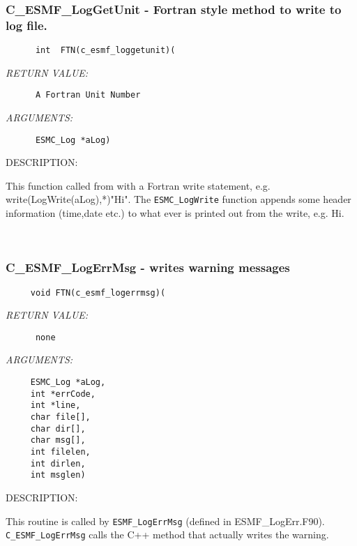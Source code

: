   \subsubsection [C\_ESMF\_LogGetUnit] {C\_ESMF\_LogGetUnit - Fortran style method to write to log file.}


  
\begin{verbatim}      int  FTN(c_esmf_loggetunit)(\end{verbatim}{\em RETURN VALUE:}
\begin{verbatim}      A Fortran Unit Number\end{verbatim}{\em ARGUMENTS:}
\begin{verbatim}      ESMC_Log *aLog)\end{verbatim}
{\sf DESCRIPTION:\\ }


      This function called from with a Fortran write statement, e.g.
      write(LogWrite(aLog),*)"Hi".  The {\tt ESMC\_LogWrite} function
      appends some
      header information (time,date etc.) to what ever is printed out
      from the write, e.g. Hi. 
 
\mbox{}\hrulefill\ 
 
\subsubsection [C\_ESMF\_LogErrMsg] {C\_ESMF\_LogErrMsg - writes warning messages}


  
\begin{verbatim}     void FTN(c_esmf_logerrmsg)(\end{verbatim}{\em RETURN VALUE:}
\begin{verbatim}      none\end{verbatim}{\em ARGUMENTS:}
\begin{verbatim}     ESMC_Log *aLog,
     int *errCode,
     int *line, 
     char file[],
     char dir[],
     char msg[], 
     int filelen,
     int dirlen,
     int msglen)\end{verbatim}
{\sf DESCRIPTION:\\ }


      This routine is called by {\tt ESMF\_LogErrMsg} (defined in ESMF\_LogErr.F90).  
      {\tt C\_ESMF\_LogErrMsg} calls the C++ method that actually writes
      the warning.
   
